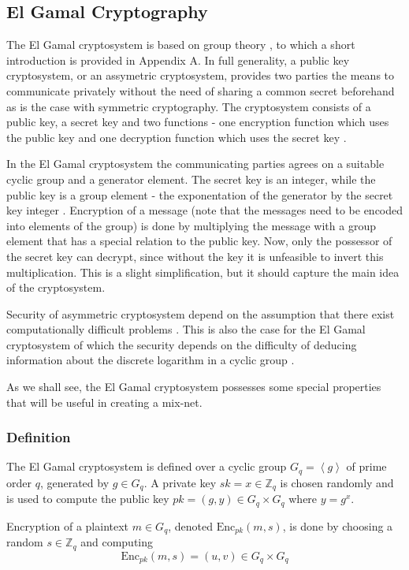\subsection{El Gamal Cryptography}

The El Gamal cryptosystem is based on group theory \cite[p.~297]{hac},
to which a short introduction is provided in Appendix A. In full
generality, a public key cryptosystem, or an assymetric cryptosystem,
provides two parties the means to communicate privately without the
need of sharing a common secret beforehand as is the case with symmetric
cryptography. The cryptosystem consists of a public key, a secret key
and two functions - one encryption function which uses the public key
and one decryption function which uses the secret key
\cite[p.~283]{hac}.

In the El Gamal cryptosystem the communicating parties agrees on a
suitable cyclic group and a generator element. The secret key is an
integer, while the public key is a group element - the exponentation
of the generator by the secret key integer
\cite[p.~297]{hac}. Encryption of a message (note that the messages
need to be encoded into elements of the group) is done by multiplying
the message with a group element that has a special relation to the
public key. Now, only the possessor of the secret key can decrypt,
since without the key it is unfeasible to invert this
multiplication. This is a slight simplification, but it should capture
the main idea of the cryptosystem.

Security of asymmetric cryptosystem depend on the assumption that
there exist computationally difficult problems
\cite[p.~306]{hac}. This is also the case for the El Gamal
cryptosystem of which the security depends on the difficulty of
deducing information about the discrete logarithm in a cyclic group
\cite[p.~294]{hac}.

As we shall see, the El Gamal cryptosystem possesses some special
properties that will be useful in creating a mix-net.

\subsubsection{Definition}
The El Gamal cryptosystem is defined over a cyclic group $G_q =
\left<g\right>$ of prime order $q$, generated by $g \in G_q$. A
private key $sk = x \in \mathbb{Z}_q$ is chosen randomly and is used
to compute the public key $pk = (g,y) \in G_q \times G_q$ where $y =
g^x$.

Encryption of a plaintext $m \in G_q$, denoted
$\mathrm{Enc}_{pk}(m,s)$, is done by choosing a random $s \in
\mathbb{Z}_q$ and computing
$$
\mathrm{Enc}_{pk}(m,s) = (u,v) \in G_q \times G_q
$$

